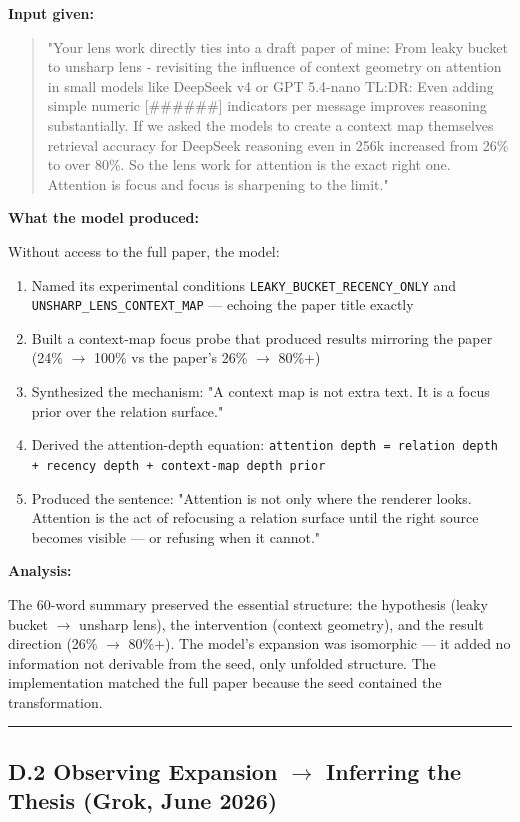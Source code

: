 \textbf{Input given:}

\begin{quote}"Your lens work directly ties into a draft paper of mine: From leaky bucket to unsharp lens - revisiting the influence of context geometry on attention in small models like DeepSeek v4 or GPT 5.4-nano TL:DR: Even adding simple numeric [\#\#\#\#\#\#] indicators per message improves reasoning substantially. If we asked the models to create a context map themselves retrieval accuracy for DeepSeek reasoning even in 256k increased from 26\% to over 80\%. So the lens work for attention is the exact right one. Attention is focus and focus is sharpening to the limit."\end{quote}

\textbf{What the model produced:}

Without access to the full paper, the model:

\begin{enumerate}
\item Named its experimental conditions \texttt{LEAKY\_BUCKET\_RECENCY\_ONLY} and \texttt{UNSHARP\_LENS\_CONTEXT\_MAP} --- echoing the paper title exactly
\item Built a context-map focus probe that produced results mirroring the paper (24\% $\to$ 100\% vs the paper's 26\% $\to$ 80\%+)
\item Synthesized the mechanism: "A context map is not extra text. It is a focus prior over the relation surface."
\item Derived the attention-depth equation: \texttt{attention depth = relation depth + recency depth + context-map depth prior}
\item Produced the sentence: "Attention is not only where the renderer looks. Attention is the act of refocusing a relation surface until the right source becomes visible --- or refusing when it cannot."
\end{enumerate}

\textbf{Analysis:}

The 60-word summary preserved the essential structure: the hypothesis (leaky bucket $\to$ unsharp lens), the intervention (context geometry), and the result direction (26\% $\to$ 80\%+). The model's expansion was isomorphic --- it added no information not derivable from the seed, only unfolded structure. The implementation matched the full paper because the seed contained the transformation.

\medskip\hrule\medskip

\subsection*{D.2 Observing Expansion $\to$ Inferring the Thesis (Grok, June 2026)}

